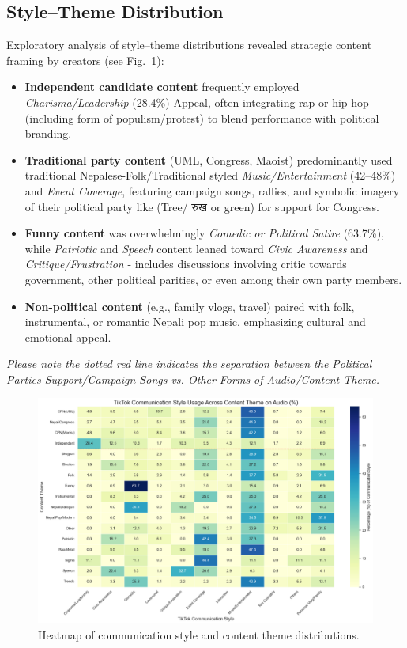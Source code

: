 \documentclass[12pt,a4paper]{report}
\begin{document}
\subsection{Style--Theme Distribution}
Exploratory analysis of style--theme distributions revealed strategic content framing by creators (see Fig.~\ref{fig:TikTokComm}):
\begin{itemize}[noitemsep]
    \item \textbf{Independent candidate content} frequently employed \emph{Charisma/Leadership} (28.4\%) Appeal, often integrating rap or hip-hop (including  form of populism/protest) to blend performance with political branding.
    \item \textbf{Traditional party content} (UML, Congress, Maoist) predominantly used traditional Nepalese-Folk/Traditional styled \emph{Music/Entertainment} (42--48\%) and \emph{Event Coverage}, featuring campaign songs, rallies, and symbolic imagery of their political party like (Tree/ \texthindi{रुख} or green) for support for Congress.
    \item \textbf{Funny content} was overwhelmingly \emph{Comedic or Political Satire} (63.7\%), while \emph{Patriotic} and \emph{Speech} content leaned toward \emph{Civic Awareness} and \emph{Critique/Frustration} - includes discussions involving critic towards government, other political parities, or even among their own party members.
    \item \textbf{Non-political content} (e.g., family vlogs, travel) paired with folk, instrumental, or romantic Nepali pop music, emphasizing cultural and emotional appeal.
\end{itemize}
\textit{Please note the dotted red line indicates the separation between the Political Parties Support/Campaign Songs vs. Other Forms of Audio/Content Theme. }
\begin{figure}[ht]
\centering
\includegraphics[width=1.0\textwidth]{figures/RQ2/TikTok_Comm_Heatmap.png}
\caption{Heatmap of communication style and content theme distributions.}
\label{fig:TikTokComm}
\end{figure}
\end{document}
